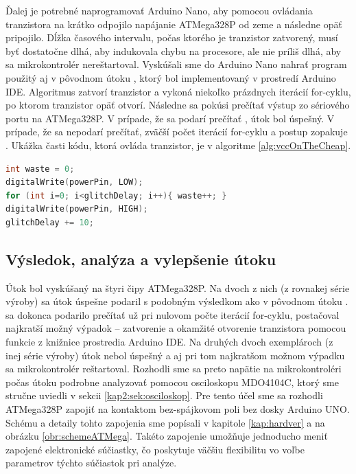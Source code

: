 Ďalej je potrebné naprogramovať Arduino Nano, aby pomocou ovládania tranzistora na krátko odpojilo napájanie ATMega328P od zeme a následne opäť pripojilo. Dĺžka časového intervalu, počas ktorého je tranzistor zatvorený, musí byť dostatočne dlhá, aby indukovala chybu na procesore, ale nie príliš dlhá, aby sa mikrokontrolér nereštartoval. Vyskúšali sme do Arduino Nano nahrať program použitý aj v pôvodnom útoku \cite{vccOnTheCheap}, ktorý bol implementovaný v prostredí Arduino IDE. Algoritmus zatvorí tranzistor a vykoná niekoľko prázdnych iterácií for-cyklu, po ktorom tranzistor opäť otvorí. Následne sa pokúsi prečítať výstup zo sériového portu na ATMega328P. V prípade, že sa podarí prečítať , útok bol úspešný. V prípade, že sa  nepodarí prečítať, zväčší počet iterácií for-cyklu a postup zopakuje \cite{vccOnTheCheap}. Ukážka časti kódu, ktorá ovláda tranzistor, je v algoritme \ref{alg:vccOnTheCheap}.

\begin{lstlisting}[float,language=C,caption={Ovládanie tranzistora, ktorý spína napájanie na ATMega328P. Prevzaté zo zdrojového kódu pôvodného útoku \cite{vccOnTheCheap}. Cieľom premennej \uv{waste} je zabrániť, aby optimalizácia kompilátora odstránila for-cyklus.},label=alg:vccOnTheCheap]
int waste = 0;
digitalWrite(powerPin, LOW);
for (int i=0; i<glitchDelay; i++){ waste++; }                    
digitalWrite(powerPin, HIGH);
glitchDelay += 10;
\end{lstlisting}

\subsection{Výsledok, analýza a vylepšenie útoku} \label{kap3:sek:vylepsenie}
Útok bol vyskúšaný na štyri čipy ATMega328P. Na dvoch z nich (z rovnakej série výroby) sa útok úspešne podaril s podobným výsledkom ako v pôvodnom útoku \cite{vccOnTheCheap}.  sa dokonca podarilo prečítať už pri nulovom počte iterácií for-cyklu, postačoval najkratší možný výpadok -- zatvorenie a okamžité otvorenie tranzistora pomocou funkcie  z knižnice prostredia Arduino IDE. Na druhých dvoch exemplároch (z inej série výroby) útok nebol úspešný a aj pri tom najkratšom možnom výpadku sa mikrokontrolér reštartoval. Rozhodli sme sa preto napätie na mikrokontroléri počas útoku podrobne analyzovať pomocou osciloskopu MDO4104C, ktorý sme stručne uviedli v sekcii \ref{kap2:sek:osciloskop}. Pre tento účel sme sa rozhodli ATMega328P zapojiť na kontaktom bez-spájkovom poli bez dosky Arduino UNO. Schému a detaily tohto zapojenia sme popísali v kapitole \ref{kap:hardver} a na obrázku \ref{obr:schemeATMega}. Takéto zapojenie umožňuje jednoducho meniť zapojené elektronické súčiastky, čo poskytuje väčšiu flexibilitu vo voľbe parametrov týchto súčiastok pri analýze.

